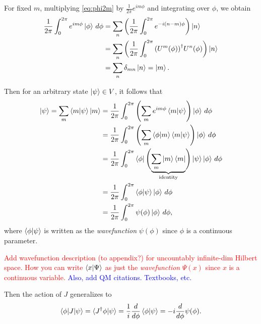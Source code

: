     For fixed $m$, multiplying \cref{eq:phi2m} by $\frac{1}{2\pi} e^{im\phi}$ and integrating over $\phi$, we obtain
    \begin{align*}
        \frac{1}{2\pi}\int_{0}^{2\pi} e^{im\phi}\ket{\phi} \,d\phi 
            &= \sum_n \left( \frac{1}{2\pi}\int_{0}^{2\pi}e^{-i(n-m)\phi} \right)\ket{n} \\
            &= \sum_n \left( \frac{1}{2\pi}\int_{0}^{2\pi}{(U^m(\phi))}^\dagger U^n(\phi) \right)\ket{n} \\
            &= \sum_n \delta_{mn}\ket{n} = \ket{m}.
    \end{align*}

    Then for an arbitrary state $\ket{\psi}\in V$, it follows that
    \begin{align*}
        \ket{\psi} = \sum_m \braket{m|\psi}\ket{m} 
            &= \frac{1}{2\pi}\int_{0}^{2\pi} \left( \sum_m e^{im\phi}\braket{m|\psi} \right)\ket{\phi} \,d\phi \\
            &= \frac{1}{2\pi}\int_{0}^{2\pi} \left( \sum_m \braket{\phi|m}\braket{m|\psi} \right)\ket{\phi} \,d\phi \\
            &= \frac{1}{2\pi}\int_{0}^{2\pi} \bra{\phi}\Biggl( \underbrace{\sum_m \ket{m}\bra{m}}_{\textrm{identity}} \Biggr)\ket{\psi}\ket{\phi} \,d\phi \\
            &= \frac{1}{2\pi}\int_{0}^{2\pi} \braket{\phi|\psi}\ket{\phi} \,d\phi \\
            &= \frac{1}{2\pi}\int_{0}^{2\pi} \psi(\phi)\ket{\phi} \,d\phi,
    \end{align*}
    where $\braket{\phi|\psi}$ is written as the \textit{wavefunction} $\psi(\phi)$ since $\phi$ is a continuous parameter.

    \textcolor{red}{Add wavefunction description (to appendix?) for uncountably infinite-dim Hilbert space. How you can write $\braket{x|\Psi}$ as just the \textit{wavefunction} $\Psi(x)$ since $x$ is a continuous variable.} \textcolor{blue}{Also, add QM citations. Textbooks, etc.}

    Then the action of $J$ generalizes to
    \begin{align*}
        \braket{\phi|J|\psi} = \braket{J^\dagger \phi|\psi} = \frac{1}{i}\frac{d}{d\phi}\braket{\phi|\psi} = -i\frac{d}{d\phi}\psi(\phi).
    \end{align*}
    

